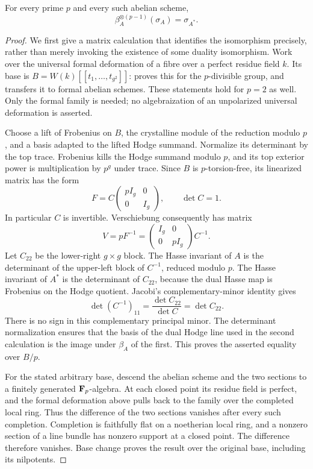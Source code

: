 \begin{theorem}\label{thm:DE-hasse}
For every prime $p$ and every such abelian scheme,
\[
                  \beta_A^{\otimes(p-1)}(\sigma_A)=\sigma_{A^*}.
\]
\end{theorem}
\begin{proof}
We first give a matrix calculation that identifies the isomorphism precisely, rather than merely invoking the existence of some duality isomorphism.  Work over the universal formal deformation of a fibre over a perfect residue field $k$.  Its base is
$B=W(k)[[t_1,\ldots,t_{g^2}]]$: \cite[Corollary~4.8(i)]{Illusie1985BT} proves this for the $p$-divisible group, and \cite[Theorem~1.2.1]{Katz1981ST} transfers it to formal abelian schemes.  These statements hold for $p=2$ as well.  Only the formal family is needed; no algebraization of an unpolarized universal deformation is asserted.

Choose a lift of Frobenius on $B$, the crystalline module of the reduction modulo $p$, and a basis adapted to the lifted Hodge summand.  Normalize its determinant by the top trace.  Frobenius kills the Hodge summand modulo $p$, and its top exterior power is multiplication by $p^g$ under trace.  Since $B$ is $p$-torsion-free, its linearized matrix has the form
\[
 F=C\begin{pmatrix}pI_g&0\\0&I_g\end{pmatrix},
 \qquad \det C=1.
\]
In particular $C$ is invertible.  Verschiebung consequently has matrix
\[
 V=pF^{-1}=\begin{pmatrix}I_g&0\\0&pI_g\end{pmatrix}C^{-1}.
\]
Let $C_{22}$ be the lower-right $g\times g$ block.  The Hasse invariant of $A$ is the determinant of the upper-left block of $C^{-1}$, reduced modulo $p$.  The Hasse invariant of $A^*$ is the determinant of $C_{22}$, because the dual Hasse map is Frobenius on the Hodge quotient.  Jacobi's complementary-minor identity gives
\[
             \det (C^{-1})_{11}=\frac{\det C_{22}}{\det C}
                             =\det C_{22}.
\]
There is no sign in this complementary principal minor.  The determinant normalization ensures that the basis of the dual Hodge line used in the second calculation is the image under $\beta_A$ of the first.  This proves the asserted equality over $B/p$.

For the stated arbitrary base, descend the abelian scheme and the two sections to a finitely generated $\mathbf F_p$-algebra.  At each closed point its residue field is perfect, and the formal deformation above pulls back to the family over the completed local ring.  Thus the difference of the two sections vanishes after every such completion.  Completion is faithfully flat on a noetherian local ring, and a nonzero section of a line bundle has nonzero support at a closed point.  The difference therefore vanishes.  Base change proves the result over the original base, including its nilpotents.
\end{proof}

